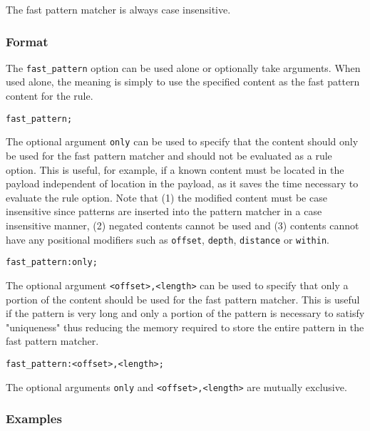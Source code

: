 \documentclass[english]{report}
\newenvironment{note}{
\samepage
    \vspace{10pt}{\textsf{
        {\hspace{7pt}\Huge{$\triangle$\hspace{-12.5pt}{\Large{$^!$}}}}\hspace{5pt}
        {\Large{NOTE}}
    }
    }
   \begin{center}
    \par\vspace{-17pt}

    \begin{lrbox}{\savepar}
    \begin{minipage}[r]{6in}
}
{
    \end{minipage}
    \end{lrbox}
    \fbox{
        \usebox{
            \savepar
	}
    }
    \par\vskip10pt
    \end{center}
}
\newenvironment{note}{
        \begin{rawhtml}
        <p><table border="1"><tr><td><b>
        Note:&nbsp;&nbsp;</b>
        \end{rawhtml}
}{
        \begin{rawhtml}
        </b></td></tr></table></p>
        \end{rawhtml}
}
\begin{document}
\begin{note}
The fast pattern matcher is always case insensitive.
\end{note}

\subsubsection{Format}
The \texttt{fast\_pattern} option can be used alone or optionally take arguments.
When used alone, the meaning is simply to use the specified content as the
fast pattern content for the rule.

\begin{verbatim}
fast_pattern;
\end{verbatim}

The optional argument \texttt{only} can be used to specify that the content
should only be used for the fast pattern matcher and should not be evaluated
as a rule option.  This is useful, for example, if a known content must be
located in the payload independent of location in the payload, as it saves
the time necessary to evaluate the rule option.  
Note that (1) the modified content must be case insensitive since
patterns are inserted into the pattern matcher in a case insensitive manner,
(2) negated contents cannot be used and (3) contents cannot have any positional
modifiers such as \texttt{offset}, \texttt{depth}, \texttt{distance}
or \texttt{within}.
\begin{verbatim}
fast_pattern:only;
\end{verbatim}

The optional argument \texttt{<offset>,<length>} can be used to specify that
only a portion of the content should be used for the fast pattern matcher.
This is useful if the pattern is very long and only a portion of the pattern
is necessary to satisfy "uniqueness" thus reducing the memory required to
store the entire pattern in the fast pattern matcher.
\begin{verbatim}
fast_pattern:<offset>,<length>;
\end{verbatim}

\begin{note}
The optional arguments \texttt{only} and \texttt{<offset>,<length>} are
mutually exclusive.
\end{note}

\subsubsection{Examples}
\end{document}
